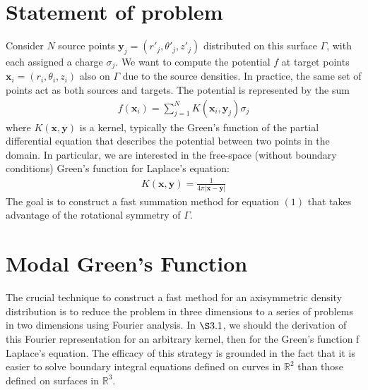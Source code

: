 \documentclass[11pt, oneside]{article}   	%
\begin{document}
\section{Statement of problem}
Consider $N$ source points $\mathbf{y}_j=(r'_j,\theta'_j,z'_j)$ distributed on this surface $\Gamma$, with each assigned a charge $\sigma_j$. We want to compute the potential $f$ at target points $\mathbf{x}_i=(r_i,\theta_i,z_i)$ also on $\Gamma$ due to the source densities.  In practice, the same set of points act as both sources and targets. The potential is represented by the sum
\begin{align}
f(\mathbf{x}_i) = \sum_{j=1}^N K(\mathbf{x}_i,\mathbf{y}_j)\sigma_j
\end{align}
where $K(\mathbf{x},\mathbf{y})$ is a kernel, typically the Green's function of the partial differential equation that describes the potential between two points in the domain. In particular, we are interested in the free-space (without boundary conditions) Green's function for Laplace's equation:
\begin{align}
K(\mathbf{x},\mathbf{y}) = \frac{1}{4\pi |\mathbf{x}-\mathbf{y}|}
\end{align}
The goal is to construct a fast summation method for equation $(1)$ that takes advantage of the rotational symmetry of $\Gamma$.

\section{Modal Green's Function}

The crucial technique to construct a fast method for an axisymmetric density distribution is to reduce the problem in three dimensions to a series of problems in two dimensions using Fourier analysis. In $\S3.1$, we should the derivation of this Fourier representation for an arbitrary kernel, then for the Green's function f Laplace's equation. The efficacy of this strategy is grounded in the fact that it is easier to solve boundary integral equations defined on curves in $\mathbb{R}^2$ than those defined on surfaces in $\mathbb{R}^3$.
\end{document}
